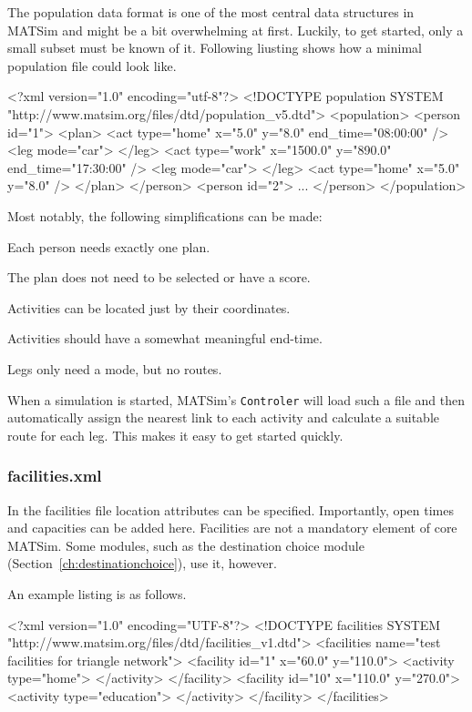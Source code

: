 The population data format is one of the most central data structures in MATSim and might be a bit overwhelming at first. Luckily, to get started, only a small subset must be known of it. Following liusting shows how a minimal population file could look like. 

\begin{xml}
<?xml version="1.0" encoding="utf-8"?> 
<!DOCTYPE population SYSTEM "http://www.matsim.org/files/dtd/population_v5.dtd"> 
<population> 
   <person id="1"> 
      <plan> 
         <act type="home" x="5.0" y="8.0" end_time="08:00:00" /> 
         <leg mode="car"> 
         </leg> 
         <act type="work" x="1500.0" y="890.0" end_time="17:30:00" /> 
         <leg mode="car"> 
         </leg> 
         <act type="home" x="5.0" y="8.0" /> 
      </plan> 
   </person> 
   <person id="2"> 
      ... 
   </person> 
</population>
\end{xml}

Most notably, the following simplifications can be made:
\begin{compactitem}
\item Each person needs exactly one plan.
\item The plan does not need to be selected or have a score.
\item Activities can be located just by their coordinates.
\item Activities should have a somewhat meaningful end-time.
\item Legs only need a mode, but no routes.
\end{compactitem}
When a simulation is started, MATSim's \lstinline|Controler| will load such a file and then automatically assign the nearest link to each activity and calculate a suitable route for each leg. This makes it easy to get started quickly. 

\subsubsection{facilities.xml}
In the facilities file location attributes can be specified. Importantly, open times and capacities can be added here. Facilities are not a mandatory element of core MATSim. Some modules, such as the destination choice module (Section~\ref{ch:destinationchoice}), use it, however.

An example listing is as follows.
\begin{xml}
<?xml version="1.0" encoding="UTF-8"?>
<!DOCTYPE facilities SYSTEM "http://www.matsim.org/files/dtd/facilities_v1.dtd">
<facilities name="test facilities for triangle network">
	<facility id="1" x="60.0" y="110.0">
		<activity type="home">
		</activity>
	</facility>
	<facility id="10" x="110.0" y="270.0">
		<activity type="education">
		</activity>
	</facility>
</facilities>
\end{xml}

